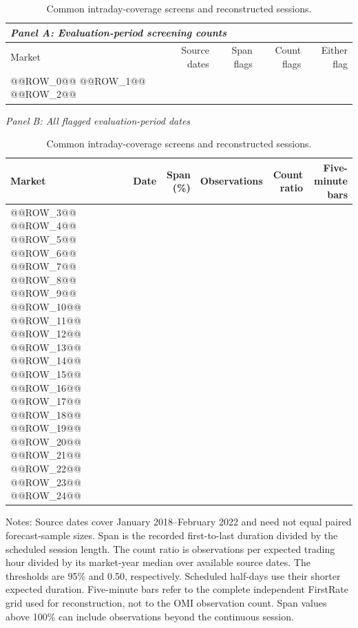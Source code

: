 \begin{table}[p]
\centering
\begin{threeparttable}
\caption{Common intraday-coverage screens and reconstructed sessions.}
\label{tab:coverage-screen}
\scriptsize
\renewcommand{\arraystretch}{0.95}
\setlength{\tabcolsep}{3pt}
\begin{tabular*}{\textwidth}{@{\extracolsep{\fill}}lrrrr@{}}
\multicolumn{5}{l}{\textit{Panel A: Evaluation-period screening counts}} \\
\toprule
Market & Source dates & Span flags & Count flags & Either flag \\
\midrule
@@ROW_0@@
@@ROW_1@@
@@ROW_2@@
\bottomrule
\end{tabular*}
\vspace{0.4em}
\noindent\textit{Panel B: All flagged evaluation-period dates}\par
\begin{tabular*}{\textwidth}{@{\extracolsep{\fill}}llrrrr@{}}
\toprule
Market & Date & Span (\%) & Observations & Count ratio & Five-minute bars \\
\midrule
@@ROW_3@@
@@ROW_4@@
@@ROW_5@@
@@ROW_6@@
@@ROW_7@@
@@ROW_8@@
@@ROW_9@@
@@ROW_10@@
@@ROW_11@@
@@ROW_12@@
@@ROW_13@@
@@ROW_14@@
@@ROW_15@@
@@ROW_16@@
@@ROW_17@@
@@ROW_18@@
@@ROW_19@@
@@ROW_20@@
@@ROW_21@@
@@ROW_22@@
@@ROW_23@@
@@ROW_24@@
\bottomrule
\end{tabular*}
\begin{tablenotes}[flushleft]
\scriptsize
\item Notes: Source dates cover January 2018--February 2022 and need not equal paired forecast-sample sizes. Span is the recorded first-to-last duration divided by the scheduled session length. The count ratio is observations per expected trading hour divided by its market-year median over available source dates. The thresholds are 95\% and 0.50, respectively. Scheduled half-days use their shorter expected duration. Five-minute bars refer to the complete independent FirstRate grid used for reconstruction, not to the OMI observation count. Span values above 100\% can include observations beyond the continuous session.
\end{tablenotes}
\end{threeparttable}
\end{table}
